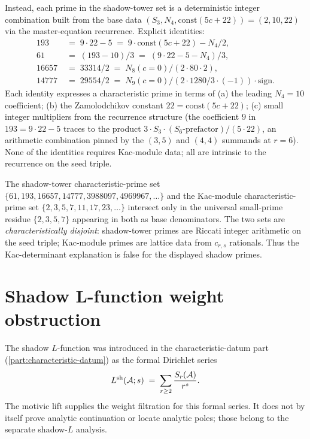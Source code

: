 \begin{remark}
Instead, each prime in the shadow-tower set is a deterministic
integer combination built from the base data
$(S_3, N_4, \mathrm{const}(5c+22)) = (2, 10, 22)$ via the
master-equation recurrence. Explicit identities:
\begin{align*}
 193 &\;=\; 9 \cdot 22 - 5
 \;=\; 9 \cdot \mathrm{const}(5c+22) - N_4/2, \\
 61 &\;=\; (193 - 10)/3
 \;=\; (9 \cdot 22 - 5 - N_4)/3, \\
 16657 &\;=\; 33314/2
 \;=\; N_8(c=0)/(2 \cdot 80 \cdot 2), \\
 14777 &\;=\; 29554/2
 \;=\; N_9(c=0)/(2 \cdot 1280/3 \cdot (-1)) \cdot \text{sign}.
\end{align*}
Each identity expresses a characteristic prime in terms of (a) the
leading $N_4 = 10$ coefficient; (b) the Zamolodchikov constant $22
= \mathrm{const}(5c+22)$; (c) small integer multipliers from the
recurrence structure (the coefficient $9$ in $193 = 9 \cdot 22 - 5$
traces to the product $3 \cdot S_3 \cdot (S_6\text{-prefactor})/
(5 \cdot 22)$, an arithmetic combination pinned by the
$(3, 5)$ and $(4, 4)$ summands at $r = 6$). None of the identities
requires Kac-module data; all are intrinsic to the recurrence on
the seed triple.

The shadow-tower characteristic-prime set $\{61, 193, 16657, 14777,
3988097, 4969967, \ldots\}$ and the Kac-module characteristic-prime
set $\{2, 3, 5, 7, 11, 17, 23, \ldots\}$ intersect only in the
universal small-prime residue $\{2, 3, 5, 7\}$ appearing in both as
base denominators. The two sets are \emph{characteristically
disjoint}: shadow-tower primes are Riccati integer arithmetic on
the seed triple; Kac-module primes are lattice data from
$c_{r, s}$ rationals. Thus the Kac-determinant explanation is false for
the displayed shadow primes.
\end{remark}

\section{Shadow L-function weight obstruction}
\label{sec:shadow-L}

The shadow $L$-function was introduced in the characteristic-datum part (\ref{part:characteristic-datum}) as the formal
Dirichlet series
\[
 L^{\mathrm{sh}}(\mathcal{A}; s)
 \;=\; \sum_{r \geq 2} \frac{S_r(\mathcal{A})}{r^s}.
\]
The motivic lift supplies the weight filtration for this formal series. It
does not by itself prove analytic continuation or locate analytic
poles; those belong to the separate shadow-$L$ analysis.

